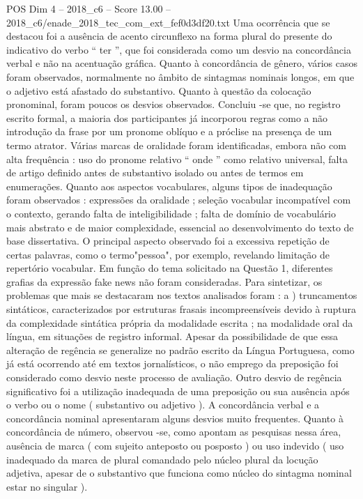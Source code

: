 \begin{textsample}{POS Dim 4 – 2018\_c6 – Score 13.00 – 2018\_c6/enade\_2018\_tec\_com\_ext\_fef0d3df20.txt}
Uma ocorrência que se destacou foi a ausência de acento circunflexo na forma plural do presente do indicativo do verbo “ ter ”, que foi considerada como um desvio na concordância verbal e não na acentuação gráfica.
Quanto à concordância de gênero, vários casos foram observados, normalmente no âmbito de sintagmas nominais longos, em que o adjetivo está afastado do substantivo.
Quanto à questão da colocação pronominal, foram poucos os desvios observados.
Concluiu -se que, no registro escrito formal, a maioria dos participantes já incorporou regras como a não introdução da frase por um pronome oblíquo e a próclise na presença de um termo atrator.
Várias marcas de oralidade foram identificadas, embora não com alta frequência : uso do pronome relativo “ onde ” como relativo universal, falta de artigo definido antes de substantivo isolado ou antes de termos em enumerações.
Quanto aos aspectos vocabulares, alguns tipos de inadequação foram observados : expressões da oralidade ; seleção vocabular incompatível com o contexto, gerando falta de inteligibilidade ; falta de domínio de vocabulário mais abstrato e de maior complexidade, essencial ao desenvolvimento do texto de base dissertativa.
O principal aspecto observado foi a excessiva repetição de certas palavras, como o termo"pessoa", por exemplo, revelando limitação de repertório vocabular.
Em função do tema solicitado na Questão 1, diferentes grafias da expressão fake news não foram consideradas.
Para sintetizar, os problemas que mais se destacaram nos textos analisados foram : a ) truncamentos sintáticos, caracterizados por estruturas frasais incompreensíveis devido à ruptura da complexidade sintática própria da modalidade escrita ; na modalidade oral da língua, em situações de registro informal.
Apesar da possibilidade de que essa alteração de regência se generalize no padrão escrito da Língua Portuguesa, como já está ocorrendo até em textos jornalísticos, o não emprego da preposição foi considerado como desvio neste processo de avaliação.
Outro desvio de regência significativo foi a utilização inadequada de uma preposição ou sua ausência após o verbo ou o nome ( substantivo ou adjetivo ).
A concordância verbal e a concordância nominal apresentaram alguns desvios muito frequentes.
Quanto à concordância de número, observou -se, como apontam as pesquisas nessa área, ausência de marca ( com sujeito anteposto ou posposto ) ou uso indevido ( uso inadequado da marca de plural comandado pelo núcleo plural da locução adjetiva, apesar de o substantivo que funciona como núcleo do sintagma nominal estar no singular ).

\end{textsample}
